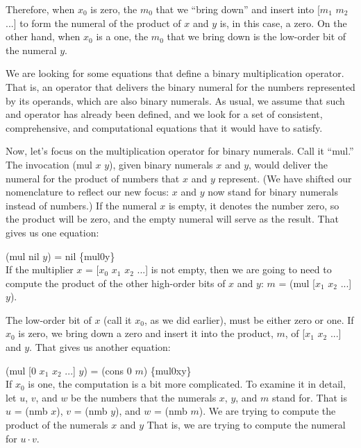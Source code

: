 Therefore, when $x_0$ is zero, the $m_0$ that we ``bring down'' and insert into
[$m_1$ $m_2$ ...] to form the numeral of the product of $x$ and $y$
is, in this case, a zero. On the other hand, when $x_0$ is a one,
the $m_0$ that we bring down is the low-order bit of the numeral $y$.

We are looking for some equations that define a binary multiplication operator.
That is, an operator that delivers the binary numeral for the numbers
represented by its operands, which are also binary numerals.
As usual, we assume that such and operator has already been defined,
and we look for a set of consistent, comprehensive, and computational
equations that it would have to satisfy.

Now, let's focus on the multiplication operator for binary numerals.
Call it ``mul.'' The invocation (mul $x$ $y$),
given binary numerals $x$ and $y$, would
deliver the numeral for the product of numbers that $x$ and $y$ represent.
(We have shifted our nomenclature to reflect our new focus:
$x$ and $y$ now stand for binary numerals
instead of numbers.)
If the numeral $x$ is empty, it denotes the number zero, so the product
will be zero, and the empty numeral will serve as the result.
That gives us one equation:

\hspace{2cm} (mul nil $y$) = nil \hspace{2cm} \hfill \{mul0y\}
\\

If the multiplier $x$ = [$x_0$ $x_1$ $x_2$ ...] is not empty,
then we are going to need to compute the product of the other
high-order bits of $x$ and $y$: $m$ = (mul [$x_1$ $x_2$ ...] $y$).

The low-order bit of $x$ (call it $x_0$, as we did earlier),
must be either zero or one.
If $x_0$ is zero, we bring down a zero and insert it into the product, $m$,
of [$x_1$ $x_2$ ...] and $y$. That gives us another equation:

\hspace{2cm} (mul [0 $x_1$ $x_2$ ...] $y$) = (cons 0 $m$) \hfill \{mul0xy\}
\\

If $x_0$ is one, the computation is a bit more complicated.
To examine it in detail, let $u$, $v$, and $w$ be the numbers
that the numerals $x$, $y$, and $m$ stand for.
That is $u$ = (nmb $x$), $v$ = (nmb $y$), and $w$ = (nmb $m$).
We are trying to compute the product of the numerals $x$ and $y$
That is, we are trying to compute the numeral for $u \cdot v$.

